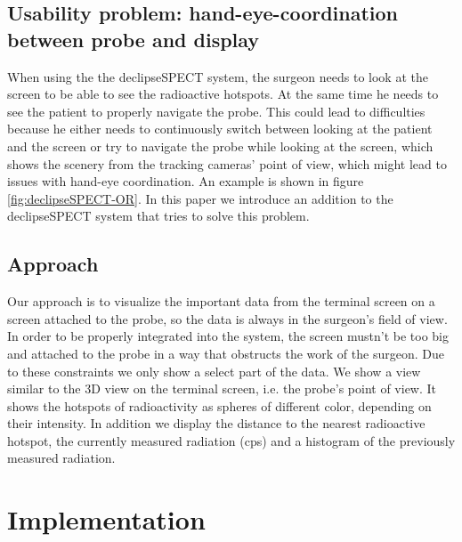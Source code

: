 \documentclass{scrartcl}
\newcommand{\refFigure}[1]{figure \ref{fig:#1}}
\begin{document}
\subsection{Usability problem: hand-eye-coordination between probe and display}
When using the the declipseSPECT system, the surgeon needs to look at the screen to be able to see the radioactive hotspots. At the same time he needs to see the patient to properly navigate the probe. This could lead to difficulties because he either needs to continuously switch between looking at the patient and the screen or try to navigate the probe while looking at the screen, which shows the scenery from the tracking cameras' point of view, which might lead to issues with hand-eye coordination. An example is shown in \refFigure{declipseSPECT-OR}.
In this paper we introduce an addition to the declipseSPECT system that tries to solve this problem.


\subsection{Approach}
Our approach is to visualize the important data from the terminal screen on a screen attached to the probe, so the data is always in the surgeon's field of view. In order to be properly integrated into the system, the screen mustn't be too big and attached to the probe in a way that obstructs the work of the surgeon. Due to these constraints we only show a select part of the data. We show a view similar to the 3D view on the terminal screen, i.e. the probe's point of view. It shows the hotspots of radioactivity as spheres of different color, depending on their intensity. In addition we display the distance to the nearest radioactive hotspot, the currently measured radiation (cps) and a histogram of the previously measured radiation.



\section{Implementation}
\end{document}

